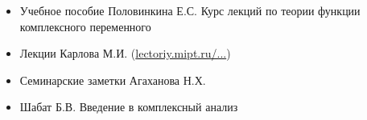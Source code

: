 \begin{itemize}[wide,  labelwidth=!, noitemsep, label=$\blacktriangleright$, labelindent = 0pt]
\item
Учебное пособие Половинкина Е.С. \glqq Курс лекций по теории функции комплексного переменного\grqq
\item
Лекции Карлова М.И. (\href{http://lectoriy.mipt.ru/course/Maths-ComplexAnalysis-13L}{lectoriy.mipt.ru/...})
\item
Семинарские заметки Агаханова Н.Х.
\item
Шабат Б.В. \glqq Введение в комплексный анализ\grqq
\end{itemize}
